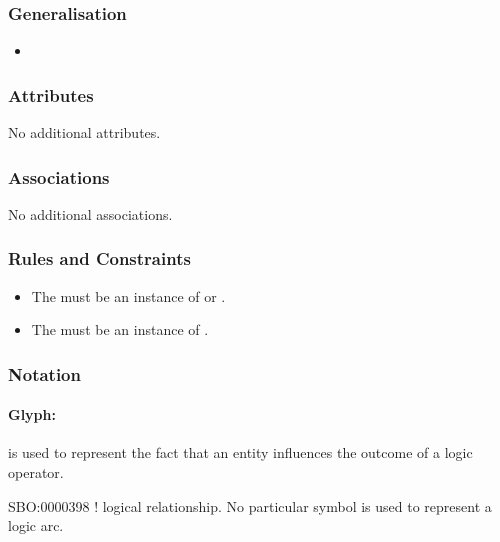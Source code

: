 \subsubsection{Generalisation}

\begin{itemize}
\item {}
\end{itemize}

\subsubsection{Attributes}

No additional attributes.

\subsubsection{Associations}

No additional associations.

\subsubsection{Rules and Constraints}

\begin{itemize}
\item The  must be an instance of
   or .
\item The  must be an instance of
  .
\end{itemize}

\subsubsection{Notation}

\paragraph{Glyph:  }\label{sec:techref:logicArc}

 is used to represent the fact that an entity influences
the outcome of a logic operator.

\begin{glyphDescription}
 \glyphSboTerm SBO:0000398 ! logical relationship.
 \glyphEndPoint No particular symbol is used to represent a logic arc.
 \end{glyphDescription}

